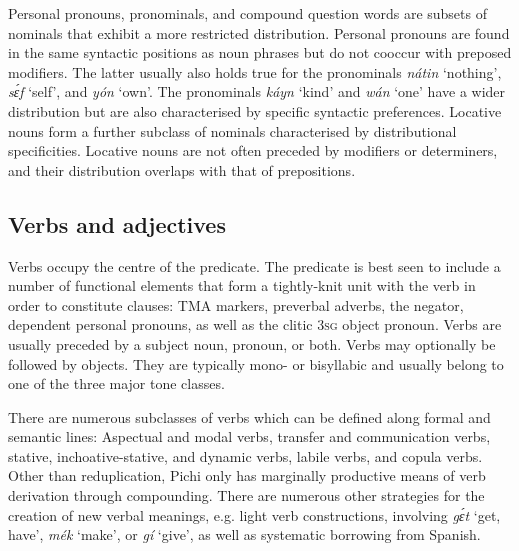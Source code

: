 Personal pronouns, pronominals, and compound question word{\fff}s are subsets of nominals that exhibit a more restricted distribution. Personal pronouns are found in the same syntactic positions as noun phrases but do not cooccur with preposed modifiers. The latter usually also holds true for the pronominals \textit{nátin} ‘nothing’, \textit{sɛ́f} ‘self’, and \textit{yón} ‘own’. The pronominals \textit{káyn} ‘kind’ and \textit{wán} ‘one’ have a wider distribution but are also characterised by specific syntactic preferences. Locative nouns{\fff} form a further subclass of nominals characterised by distributional specificities. Locative nouns are not often preceded by modifiers or determiners, and their distribution overlaps with that of prepositions. 


\subsection{Verbs and adjectives}\label{sec:4.1.2}

Verbs occupy the centre of the predicate. The predicate is best seen to include a number of functional elements that form a tightly-knit unit with the verb in order to constitute clauses: TMA markers, preverbal adverbs, the negator, dependent personal pronouns, as well as the clitic \textsc{3sg} object pronoun. Verbs are usually preceded by a subject noun, pronoun, or both. Verbs may optionally be followed by objects. They are typically mono- or bisyllabic and usually belong to one of the three major tone classes. 


There are numerous subclasses of verbs which can be defined along formal and semantic lines: Aspectual and modal verbs, transfer and communication verbs, stative, inchoative-stative, and dynamic verbs, labile verbs{\fff}, and copula verbs. Other than reduplication, Pichi only has marginally productive means of verb derivation through compounding{\fff}. There are numerous other strategies for the creation of new verbal meanings, e.g. light verb constructions, involving \textit{gɛ́t} ‘get, have’, \textit{mék} ‘make’, or \textit{gí} ‘give’, as well as systematic borrowing{\fff} from Spanish.



